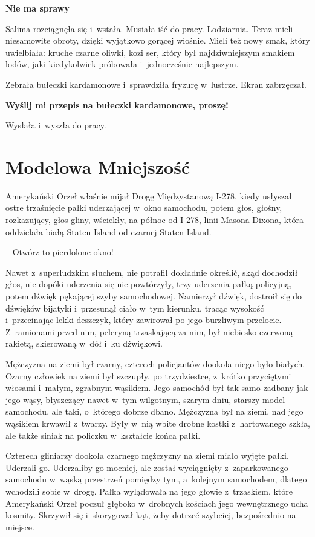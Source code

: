 \documentclass[oneside,polish,11pt,sfheadings]{mwbk}
\begin{document}
\textbf{ Nie ma sprawy}

Salima rozciągnęła się i~wstała. Musiała iść do pracy. Lodziarnia. Teraz
mieli niesamowite obroty, dzięki wyjątkowo gorącej wiośnie. Mieli też
nowy smak, który uwielbiała: kruche czarne oliwki, kozi ser, który był
najdziwniejszym smakiem lodów, jaki kiedykolwiek próbowała i~jednocześnie najlepszym.

Zebrała bułeczki kardamonowe i~sprawdziła fryzurę w~lustrze. Ekran
zabrzęczał.

\textbf{ Wyślij mi przepis na bułeczki kardamonowe,
proszę!}

Wysłała i~wyszła do pracy.

\chapter*{Modelowa Mniejszość}


Amerykański Orzeł właśnie mijał Drogę Międzystanową I-278, kiedy
usłyszał ostre trzaśnięcie pałki uderzającej w~okno samochodu, potem
głos, głośny, rozkazujący, głos gliny, wściekły, na północ od I-278,
linii Masona-Dixona, która oddzielała białą Staten Island od czarnej
Staten Island.

-- Otwórz to pierdolone okno!

Nawet z~superludzkim słuchem, nie potrafił dokładnie określić, skąd
dochodził głos, nie dopóki uderzenia się nie powtórzyły, trzy uderzenia
pałką policyjną, potem dźwięk pękającej szyby samochodowej. Namierzył
dźwięk, dostroił się do dźwięków bijatyki i~przesunął ciało w~tym
kierunku, tracąc wysokość i~przecinając lekki deszczyk, który zawirował
po jego burzliwym przelocie. Z~ramionami przed nim, peleryną trzaskającą
za nim, był niebiesko-czerwoną rakietą, skierowaną w~dół i~ku dźwiękowi.

Mężczyzna na ziemi był czarny, czterech policjantów dookoła niego było
białych. Czarny człowiek na ziemi był szczupły, po trzydziestce, z~krótko przyciętymi włosami i~małym, zgrabnym wąsikiem. Jego samochód był
tak samo zadbany jak jego wąsy, błyszczący nawet w~tym wilgotnym, szarym
dniu, starszy model samochodu, ale taki, o~którego dobrze dbano.
Mężczyzna był na ziemi, nad jego wąsikiem krwawił z~twarzy. Były w~nią
wbite drobne kostki z~hartowanego szkła, ale także siniak na policzku w~kształcie końca pałki.

Czterech gliniarzy dookoła czarnego mężczyzny na ziemi miało wyjęte
pałki. Uderzali go. Uderzaliby go mocniej, ale został wyciągnięty z~zaparkowanego samochodu w~wąską przestrzeń pomiędzy tym, a~kolejnym
samochodem, dlatego wchodzili sobie w~drogę. Pałka wylądowała na jego
głowie z~trzaskiem, które Amerykański Orzeł poczuł głęboko w~drobnych
kościach jego wewnętrznego ucha kosmity. Skrzywił się i~skorygował kąt,
żeby dotrzeć szybciej, bezpośrednio na miejsce.
\end{document}
